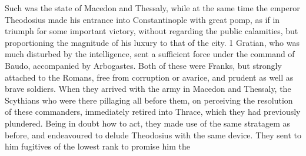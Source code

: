 Such was the state of Macedon and Thessaly, while at the same time the emperor Theodosius made his entrance into Constantinople with great pomp, as if in triumph for some important victory, without regarding the public calamities, but proportioning the magnitude of his luxury to that of the
city. 1 Gratian, who was much disturbed by the intelligence, sent a sufficient force under the command of Baudo, accompanied by Arbogastes. Both of these were Franks, but strongly attached to the Romans, free from corruption or avarice, and prudent as well as brave soldiers. When they arrived with the army in Macedon and Thessaly, the Scythians who were there pillaging all before them, on perceiving the resolution of these commanders, immediately retired into Thrace, which they had previously plundered. Being in doubt how to act, they made use of the same stratagem as before, and endeavoured to delude Theodosius with the same device. They sent to him fugitives of the lowest rank to promise him the
